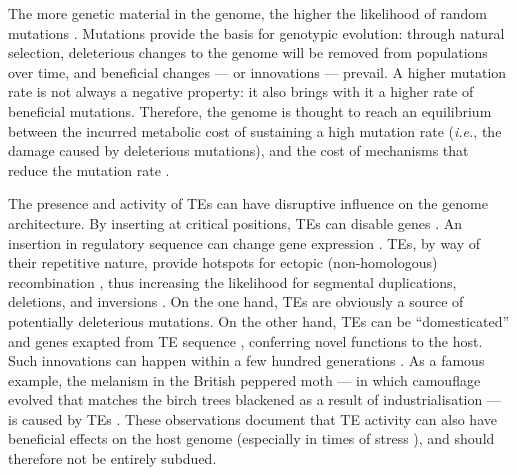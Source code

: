 The more genetic material in the genome, the higher the likelihood of
random mutations \citep{Wielgoss2011}. Mutations provide the basis for
genotypic evolution: through natural selection, deleterious changes to
the genome will be removed from populations over time, and beneficial
changes --- or innovations --- prevail. A higher mutation rate is not
always a negative property: it also brings with it a higher rate of
beneficial mutations. Therefore, the genome is thought to reach an
equilibrium between the incurred metabolic cost of sustaining a high
mutation rate (\emph{i.e.}, the damage caused by deleterious mutations),
and the cost of mechanisms that reduce the mutation rate
\citep{Bernstein1987, Altenberg2011}.

The presence and activity of TEs can have disruptive influence on the
genome architecture. By inserting at critical positions, TEs can disable
genes \citep{Kazazian1988}. An insertion in regulatory sequence can
change gene expression \citep{Warnefors2010}. TEs, by way of their
repetitive nature, provide hotspots for ectopic (non-homologous)
recombination \citep{Lim1988, Gray2000, Fiston-Lavier2007}, thus
increasing the likelihood for segmental duplications, deletions, and
inversions \citep{Mathiopoulos1998, Remnant2013}. On the one hand, TEs
are obviously a source of potentially deleterious mutations. On the
other hand, TEs can be ``domesticated'' and genes exapted from TE
sequence \citep{Gahan2001, Daborn2002, Aminetzach2005, Chen2007},
conferring novel functions to the host. Such innovations can happen
within a few hundred generations \citep{Dolgin2006, Struchiner2009,
Kofler2015}. As a famous example, the melanism in the British peppered
moth --- in which camouflage evolved that matches the birch trees
blackened as a result of industrialisation --- is caused by TEs
\citep{Hof2016}. These observations document that TE activity can also
have beneficial effects on the host genome (especially in times of
stress \citep{Chenais2012}), and should therefore not be entirely
subdued.

